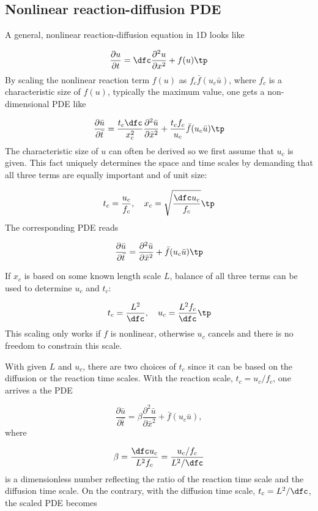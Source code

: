 \documentclass[graybox,envcountchap,sectrefs,final]{svmonodo}
\begin{document}
\subsection{Nonlinear reaction-diffusion PDE}

A general, nonlinear reaction-diffusion equation in 1D looks like

\begin{equation}
\frac{\partial u}{\partial t} = \dfc\frac{\partial^2 u}{\partial x^2} + f(u)
\tp
\end{equation}
By scaling the nonlinear reaction term $f(u)$ as $f_c\bar f(u_c\bar u)$,
where $f_c$ is a characteristic size of $f(u)$, typically the maximum
value, one gets a non-dimensional PDE like

\[
\frac{\partial\bar u}{\partial\bar t} = \frac{t_c\dfc}{x_c^2}
\frac{\partial^2\bar u}{\partial\bar x^2} +
\frac{t_cf_c}{u_c}\bar f(u_c\bar u)\tp
\]
The characteristic size of $u$ can often be derived so we first assume
that $u_c$ is given. This fact uniquely determines the space and time
scales by demanding that all three terms are equally important and
of unit size:

\[ t_c = \frac{u_c}{f_c},\quad x_c = \sqrt{\frac{\dfc u_c}{f_c}}\tp\]
The corresponding PDE reads

\begin{equation}
\frac{\partial\bar u}{\partial\bar t} =
\frac{\partial^2\bar u}{\partial\bar x^2} + \bar f(u_c\bar u)\tp
\end{equation}

If $x_c$ is based on some known length scale $L$, balance of all three
terms can be used to determine $u_c$ and $t_c$:

\[ t_c = \frac{L^2}{\dfc},\quad u_c = \frac{L^2 f_c}{\dfc}\tp\]
This scaling only works if $f$ is nonlinear, otherwise $u_c$ cancels
and there is no freedom to constrain this scale.

With given $L$ and $u_c$, there are two choices of $t_c$ since it can
be based on the diffusion or the reaction time scales. With
the reaction scale, $t_c = u_c/f_c$, one arrives a the PDE

\begin{equation}
\frac{\partial\bar u}{\partial\bar t} =
\beta\frac{\partial^2\bar u}{\partial\bar x^2} + \bar f(u_c\bar u),
\end{equation}
where

\[ \beta = \frac{\dfc u_c}{L^2 f_c} = \frac{u_c/f_c}{L^2/\dfc}\]
is a dimensionless number reflecting the ratio of the reaction time
scale and the diffusion time scale. On the contrary,
with the
diffusion time scale, $t_c=L^2/\dfc$, the scaled PDE becomes
\end{document}
